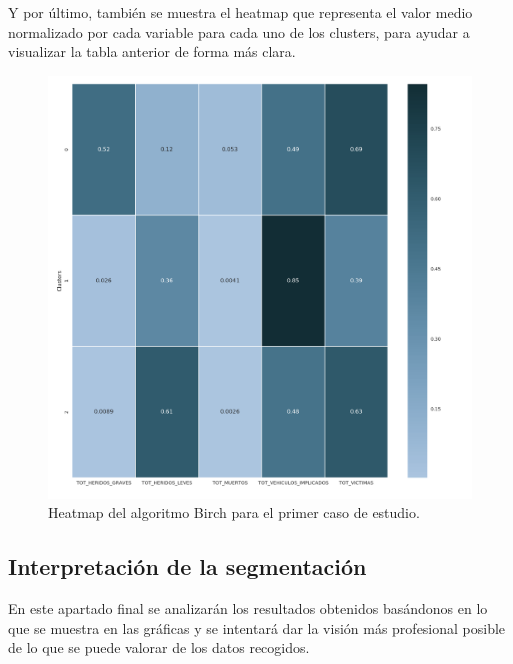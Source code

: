 	Y por último, también se muestra el heatmap que representa el valor medio normalizado por cada variable para cada uno de los clusters, para ayudar a visualizar la tabla anterior de forma más clara.

	\begin{figure}[H]
		\centering
		\includegraphics[scale=0.4]{heatmaps/Birch-HighwayAccidents-Heatmap.png}
		\caption{Heatmap del algoritmo Birch para el primer caso de estudio.}
	\end{figure}

	\subsection{Interpretación de la segmentación}
	En este apartado final se analizarán los resultados obtenidos basándonos en lo que se muestra en las gráficas y se intentará dar la visión más profesional posible de lo que se puede valorar de los datos recogidos.\\
	
